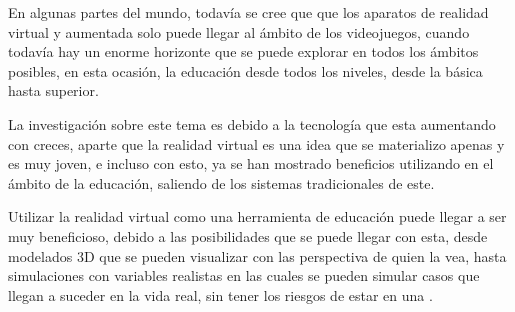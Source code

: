 En algunas partes del mundo, todavía se cree que que los aparatos de realidad virtual y aumentada solo puede llegar al ámbito de los videojuegos, cuando todavía hay un enorme horizonte que se puede explorar en todos los ámbitos posibles, en esta ocasión, la educación desde todos los niveles, desde la básica hasta superior.

La investigación sobre este tema es debido a la tecnología que esta aumentando con creces, aparte que la realidad virtual es  una idea que se materializo apenas y es muy joven, e incluso con esto, ya se han mostrado beneficios utilizando en el ámbito de la educación, saliendo de los sistemas tradicionales de este.

Utilizar la realidad virtual como una herramienta de educación puede llegar a ser muy beneficioso, debido a las posibilidades que se puede llegar con esta, desde modelados 3D que se pueden visualizar con las perspectiva de quien la vea, hasta simulaciones con variables realistas en las cuales se pueden simular casos que llegan a suceder en la vida real, sin tener los riesgos de estar en una \parencite{chen2020effectiveness}.
